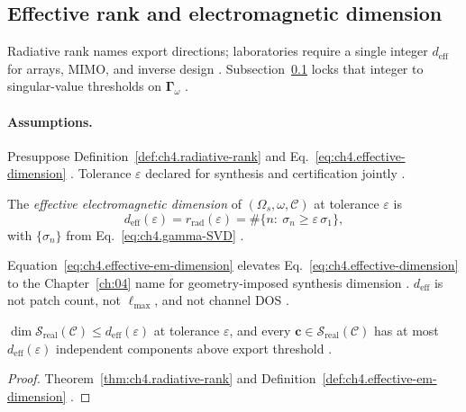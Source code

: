 \subsection{Effective rank and electromagnetic dimension}
\label{sec:ch464}

Radiative rank names export directions; laboratories require a single integer \(d_{\mathrm{eff}}\) for arrays, MIMO, and inverse design
\cite{harrington2001,devaney2004}. Subsection~\ref{sec:ch464} locks that integer to singular-value thresholds on
\(\boldsymbol{\Gamma}_\omega\) \cite{stratton1941,hansen1988}.

\paragraph{Assumptions.}
Presuppose Definition~\ref{def:ch4.radiative-rank} and Eq.~\eqref{eq:ch4.effective-dimension}
\cite{harrington2001,devaney2004}. Tolerance \(\varepsilon\) declared for synthesis and certification jointly \cite{hansen1988}.

\begin{definition}
\label{def:ch4.effective-em-dimension}
The \emph{effective electromagnetic dimension} of \((\Omega_{s},\omega,\mathcal{C})\) at tolerance \(\varepsilon\) is
\begin{equation}
\label{eq:ch4.effective-em-dimension}
d_{\mathrm{eff}}(\varepsilon)
=
r_{\mathrm{rad}}(\varepsilon)
=
\#\big\{n:\ \sigma_{n}\ge\varepsilon\,\sigma_{1}\big\},
\end{equation}
with \(\{\sigma_{n}\}\) from Eq.~\eqref{eq:ch4.gamma-SVD} \cite{stratton1941,harrington2001,hansen1988}.
\end{definition}

Equation~\eqref{eq:ch4.effective-em-dimension} elevates Eq.~\eqref{eq:ch4.effective-dimension} to the Chapter~\ref{ch:04} name for
geometry-imposed synthesis dimension \cite{devaney2004}. \(d_{\mathrm{eff}}\) is not patch count, not \(\ell_{\max}\), and not channel DOS
\cite{hansen1988,harrington2001}.

\begin{theorem}
\label{thm:ch4.dimension-bounds-realizability}
\(\dim\mathcal{S}_{\mathrm{real}}(\mathcal{C})\le d_{\mathrm{eff}}(\varepsilon)\) at tolerance \(\varepsilon\), and every
\(\mathbf{c}\in\mathcal{S}_{\mathrm{real}}(\mathcal{C})\) has at most \(d_{\mathrm{eff}}(\varepsilon)\) independent components above
export threshold \cite{stratton1941,harrington2001,devaney2004,hansen1988}.
\end{theorem}
\begin{proof}
Theorem~\ref{thm:ch4.radiative-rank} and Definition~\ref{def:ch4.effective-em-dimension} \cite{harrington2001,stratton1941}.
\end{proof}

